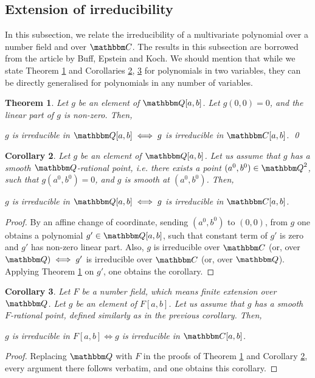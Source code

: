 \documentclass[reqno]{amsart}
\numberwithin{equation}{section}
\theoremstyle{plain}
\newtheorem{theorem}{Theorem}[section]
\newtheorem{corollary}[theorem]{Corollary}
\theoremstyle{definition}
\theoremstyle{definition}
\newcommand{\Q}{{\mathbbm Q}}
\newcommand{\C}{{\mathbbm C}}
\begin{document}
\subsection{Extension of irreducibility}
    In this subsection, we relate the irreducibility of a multivariate polynomial over a number field and over $\C$. The results in this subsection are borrowed from the article \cite{article1} by Buff, Epstein and Koch. We should mention that while we state Theorem \ref{n} and Corollaries \ref{o}, \ref{p} for polynomials in two variables, they can be directly generalised for polynomials in any number of variables.
    \begin{theorem}{\cite[Lemma~$5$]{article1}}\label{n}
        Let $g$ be an element of $\Q[a,b]$. Let $g(0,0)=0$, and the linear part of $g$ is non-zero. Then,
    
            $g$ is irreducible in $\Q[a,b] \iff g$ is irreducible in $\C[a,b]$. \qed
    \end{theorem}
    \begin{corollary}\label{o}
        Let $g$ be an element of $\Q[a,b]$. Let us assume that $g$ has a smooth $\Q$-rational point, i.e. there exists a point $(a^{0},b^{0})\in \Q^{2}$, such that $g(a^{0},b^{0})=0$, and $g$ is smooth at $(a^{0},b^{0})$. Then,
    
            $g$ is irreducible in $\Q[a,b] \iff g$ is irreducible in $\C[a,b]$.
    \end{corollary}
    \begin{proof}
        By an affine change of coordinate, sending $(a^{0},b^{0})$ to $(0,0)$, from $g$ one obtains a polynomial $g'\in \Q[a,b]$, such that constant term of $g'$ is zero and $g'$ has non-zero linear part. Also, $g$ is irreducible over $\C $ (or, over $\Q) \iff g'$ is irreducible over $\C$ (or, over $\Q$). Applying Theorem \ref{n} on $g'$, one obtains the corollary.
    \end{proof}
    \begin{corollary}\label{p}
        Let $F$ be a number field, which means finite extension over $\Q$. Let $g$ be an element of $F[a,b]$. Let us assume that $g$ has a smooth $F$-rational point, defined similarly as in the previous corollary. Then,

            $g$ is irreducible in $F[a,b] \iff g$ is irreducible in $\C[a,b]$.
    \end{corollary}
    \begin{proof}
        Replacing $\Q$ with $F$ in the proofs of Theorem \ref{n} and Corollary \ref{o}, every argument there follows verbatim, and one obtains this corollary. 
    \end{proof}
\end{document}
